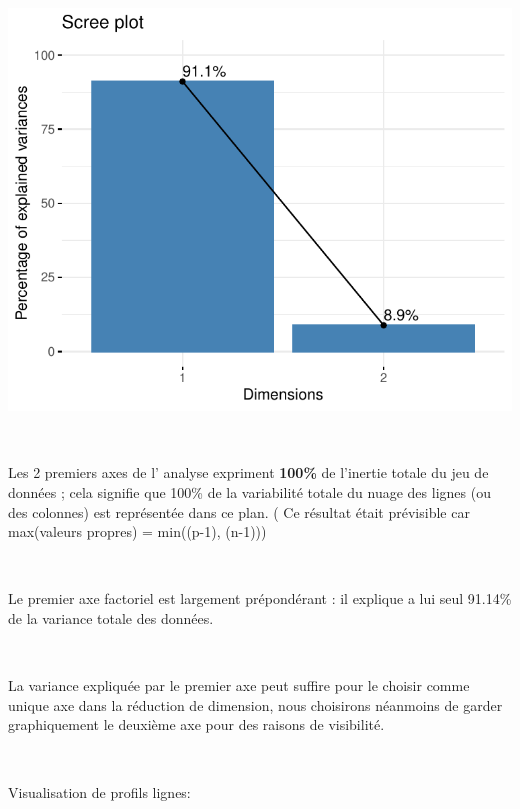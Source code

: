 \documentclass[]{imsart}
\numberwithin{equation}{section}
\theoremstyle{plain}
\begin{document}
\begin{flushleft}\includegraphics{Analyse_Exploratoire_Projet_files/figure-latex/unnamed-chunk-27-1} \end{flushleft}

~

Les 2 premiers axes de l' analyse expriment \textbf{100\%} de l'inertie totale du jeu de données ; cela signifie que 100\% de la variabilité totale du nuage des lignes (ou des colonnes) est représentée dans ce plan. ( Ce résultat était prévisible car max(valeurs propres) = min((p-1), (n-1)))

~

Le premier axe factoriel est largement prépondérant : il explique a lui seul 91.14\% de la variance totale des données.

~

La variance expliquée par le premier axe peut suffire pour le choisir comme unique axe dans la réduction de dimension, nous choisirons néanmoins de garder graphiquement le deuxième axe pour des raisons de visibilité.

~

Visualisation de profils lignes:
\end{document}
